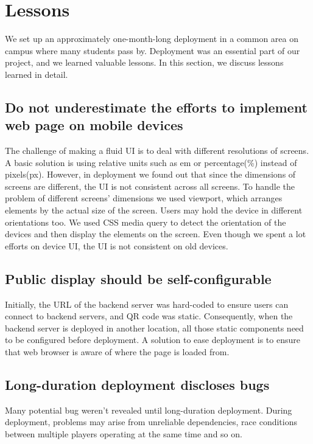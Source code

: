 \documentclass{sig-alternate}
\begin{document}
\section{Lessons}

We set up an approximately one-month-long deployment in a common area on campus where many students pass by.
Deployment was an essential part of our project, and we learned valuable lessons.
In this section, we discuss lessons learned in detail.

\subsection{Do not underestimate the efforts to implement web page on mobile devices}
The challenge of making a fluid UI is to deal with different resolutions of 
screens. A basic solution is using relative units such as em or percentage(\%) 
instead of pixels(px). However, in deployment we found out that since the 
dimensions of screens are different, the UI is not consistent across 
all screens. To handle the problem of different screens' dimensions we used 
viewport, which arranges elements by the actual size of the screen. Users 
may hold the device in different orientations too. We used CSS media query 
to detect the orientation of the devices and then display the elements on
 the screen. Even though we spent a lot efforts on device UI, the UI is not 
 consistent on old devices.
 
\subsection{Public display should be self-configurable}
Initially, the URL of the backend 
server was hard-coded to ensure users can connect to backend servers, and QR code was static. Consequently, when the backend server is 
deployed in another location, all those static components need to be configured 
before deployment. A solution to ease deployment is to ensure 
that web browser is aware of where the page is loaded from.

\subsection{Long-duration deployment discloses bugs}
Many potential bug weren't revealed until 
long-duration deployment. During deployment, problems may arise from 
unreliable dependencies, race conditions between multiple players operating 
at the same time and so on.
\end{document}
